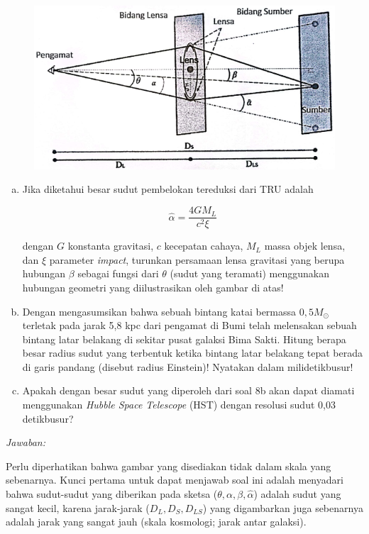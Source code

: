 \documentclass[11pt,fleqn]{exam}
\begin{document}
\begin{questions}
\begin{figure}[ht!]
    \centering
    \includegraphics[scale=0.65]{lensing.png}
\end{figure}

\begin{enumerate}[a.]
\item Jika diketahui besar sudut pembelokan tereduksi dari TRU adalah

\begin{equation*}
    \hat{\alpha} = \frac{4GM_L}{c^2\xi}
\end{equation*}

dengan $G$ konstanta gravitasi, $c$ kecepatan cahaya, $M_L$ massa objek lensa, dan $\xi$ parameter \textit{impact}, turunkan persamaan lensa gravitasi yang berupa hubungan $\beta$ sebagai fungsi dari $\theta$ (sudut yang teramati) menggunakan hubungan geometri yang diilustrasikan oleh gambar di atas!

\item Dengan  mengasumsikan bahwa sebuah bintang katai bermassa $0,5M_{\odot}$ terletak pada jarak 5,8 kpc dari pengamat di Bumi telah melensakan sebuah bintang latar belakang di sekitar pusat galaksi Bima Sakti. Hitung berapa besar radius sudut yang terbentuk ketika bintang latar belakang tepat berada di garis pandang (disebut radius Einstein)! Nyatakan dalam milidetikbusur!
\item Apakah dengan besar sudut yang diperoleh dari soal 8b akan dapat diamati menggunakan \textit{Hubble Space Telescope} (HST) dengan resolusi sudut 0,03 detikbusur?
\end{enumerate}


\newpage
\textit{Jawaban:}

Perlu diperhatikan bahwa gambar yang disediakan tidak dalam skala yang sebenarnya. Kunci pertama untuk dapat menjawab soal ini adalah menyadari bahwa sudut-sudut yang diberikan pada sketsa ($\theta, \alpha, \beta, \widehat{\alpha}$) adalah sudut yang sangat kecil, karena jarak-jarak ($D_L, D_S, D_{LS}$) yang digambarkan juga sebenarnya adalah jarak yang sangat jauh (skala kosmologi; jarak antar galaksi).


\end{questions}
\end{document}
